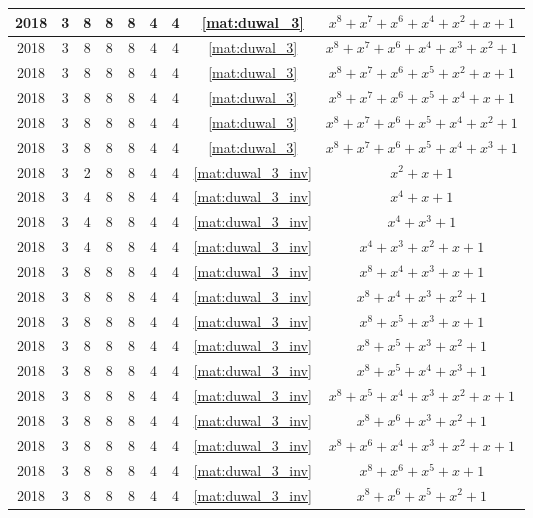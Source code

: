 \begin{longtable}{|c|c|c|c|c|c|c|c|c|}
2018 & 3 & 8 & 8 & 8 & 4 & 4 & \eqref{mat:duwal_3} & $x^8 + x^7 + x^6 + x^4 + x^2 + x + 1$ \\ \hline 
2018 & 3 & 8 & 8 & 8 & 4 & 4 & \eqref{mat:duwal_3} & $x^8 + x^7 + x^6 + x^4 + x^3 + x^2 + 1$ \\ \hline 
2018 & 3 & 8 & 8 & 8 & 4 & 4 & \eqref{mat:duwal_3} & $x^8 + x^7 + x^6 + x^5 + x^2 + x + 1$ \\ \hline 
2018 & 3 & 8 & 8 & 8 & 4 & 4 & \eqref{mat:duwal_3} & $x^8 + x^7 + x^6 + x^5 + x^4 + x + 1$ \\ \hline 
2018 & 3 & 8 & 8 & 8 & 4 & 4 & \eqref{mat:duwal_3} & $x^8 + x^7 + x^6 + x^5 + x^4 + x^2 + 1$ \\ \hline 
2018 & 3 & 8 & 8 & 8 & 4 & 4 & \eqref{mat:duwal_3} & $x^8 + x^7 + x^6 + x^5 + x^4 + x^3 + 1$ \\ \hline 
2018 & 3 & 2 & 8 & 8 & 4 & 4 & \eqref{mat:duwal_3_inv} & $x^2 + x + 1$ \\ \hline 
2018 & 3 & 4 & 8 & 8 & 4 & 4 & \eqref{mat:duwal_3_inv} & $x^4 + x + 1$ \\ \hline 
2018 & 3 & 4 & 8 & 8 & 4 & 4 & \eqref{mat:duwal_3_inv} & $x^4 + x^3 + 1$ \\ \hline 
2018 & 3 & 4 & 8 & 8 & 4 & 4 & \eqref{mat:duwal_3_inv} & $x^4 + x^3 + x^2 + x + 1$ \\ \hline 
2018 & 3 & 8 & 8 & 8 & 4 & 4 & \eqref{mat:duwal_3_inv} & $x^8 + x^4 + x^3 + x + 1$ \\ \hline 
2018 & 3 & 8 & 8 & 8 & 4 & 4 & \eqref{mat:duwal_3_inv} & $x^8 + x^4 + x^3 + x^2 + 1$ \\ \hline 
2018 & 3 & 8 & 8 & 8 & 4 & 4 & \eqref{mat:duwal_3_inv} & $x^8 + x^5 + x^3 + x + 1$ \\ \hline 
2018 & 3 & 8 & 8 & 8 & 4 & 4 & \eqref{mat:duwal_3_inv} & $x^8 + x^5 + x^3 + x^2 + 1$ \\ \hline 
2018 & 3 & 8 & 8 & 8 & 4 & 4 & \eqref{mat:duwal_3_inv} & $x^8 + x^5 + x^4 + x^3 + 1$ \\ \hline 
2018 & 3 & 8 & 8 & 8 & 4 & 4 & \eqref{mat:duwal_3_inv} & $x^8 + x^5 + x^4 + x^3 + x^2 + x + 1$ \\ \hline 
2018 & 3 & 8 & 8 & 8 & 4 & 4 & \eqref{mat:duwal_3_inv} & $x^8 + x^6 + x^3 + x^2 + 1$ \\ \hline 
2018 & 3 & 8 & 8 & 8 & 4 & 4 & \eqref{mat:duwal_3_inv} & $x^8 + x^6 + x^4 + x^3 + x^2 + x + 1$ \\ \hline 
2018 & 3 & 8 & 8 & 8 & 4 & 4 & \eqref{mat:duwal_3_inv} & $x^8 + x^6 + x^5 + x + 1$ \\ \hline 
2018 & 3 & 8 & 8 & 8 & 4 & 4 & \eqref{mat:duwal_3_inv} & $x^8 + x^6 + x^5 + x^2 + 1$ \\ \hline 

\end{longtable}
